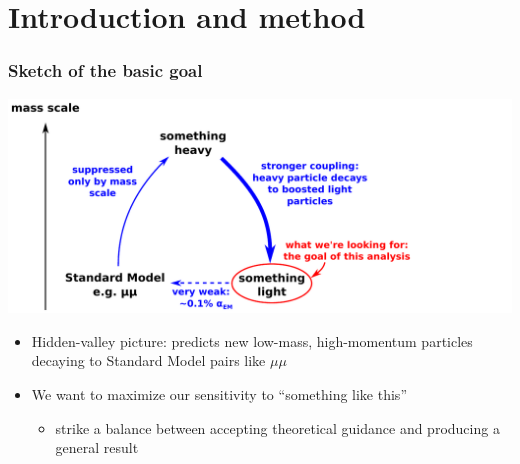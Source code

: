 \documentclass[compress]{beamer}
\begin{document}

\small

\section*{Introduction and method}


\begin{frame}
\frametitle{Sketch of the basic goal}
\includegraphics[width=\linewidth]{basic_picture.pdf}

\vspace{0.5 cm}
\begin{itemize}
\item Hidden-valley picture: predicts new low-mass, high-momentum particles decaying to Standard Model pairs like $\mu\mu$
\item We want to maximize our sensitivity to ``something like this''
\begin{itemize}
\item strike a balance between accepting theoretical guidance and producing a general result
\end{itemize}
\end{itemize}
\end{frame}
\end{document}
